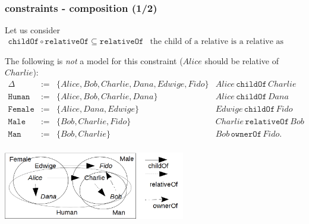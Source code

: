 \documentclass[8pt]{beamer}
\newcommand{\Human}{\mathtt{Human}}
\newcommand{\Male}{\mathtt{Male}}
\newcommand{\Female}{\mathtt{Female}}
\newcommand{\Man}{\mathtt{Man}}
\newcommand{\relative}{\mathtt{relativeOf}}
\newcommand{\child}{\mathtt{childOf}}
\newcommand{\owner}{\mathtt{ownerOf}}
\newcommand{\Alice}{Alice}
\newcommand{\Bob}{Bob}
\newcommand{\Charlie}{Charlie}
\newcommand{\Dana}{Dana}
\newcommand{\Edwige}{Edwige}
\newcommand{\Fido}{Fido}
\begin{document}
\begin{frame}
 \frametitle{\elplusplus constraints - composition (1/2)}
 Let us consider
 \[
 \begin{array}{cr}
    \child \circ \relative \subseteq \relative & \mbox{the child of a relative is a relative as well.}
 \end{array}
 \]

 The following is \emph{not} a model for this constraint ($\Alice$ should be relative of $\Charlie$):
 \[
 \begin{array}{rcl|l}
  \Delta & := & \{ \Alice, \Bob, \Charlie, \Dana, \Edwige, \Fido \} & \Alice\,\child\,\Charlie \\
  \Human & := & \{ \Alice, \Bob, \Charlie, \Dana \} & \Alice\,\child\,\Dana\\
  \Female & := & \{ \Alice, \Dana, \Edwige \} & \Edwige\,\child\,\Fido\\
  \Male & := & \{ \Bob, \Charlie, \Fido \} & \Charlie\,\relative\,\Bob \\
  \Man & := & \{ \Bob, \Charlie \} & \Bob\,\owner\,\Fido . \\
 \end{array}
\]

 \begin{center}
  \includegraphics[width=300px, keepaspectratio]{images/exbaseman_big.png}  
 \end{center}
\end{frame}
\end{document}
